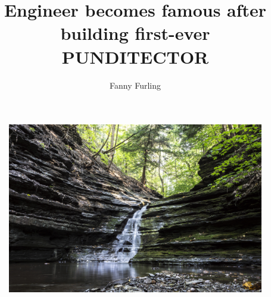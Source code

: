 \documentclass{bonaparticle}
\title {Engineer becomes famous after building first-ever PUNDITECTOR}
\author{Fanny Furling}
\begin{document}
    \maketitle
    
    \begin{lead}
        \lipsum[1]
    \end{lead}
    
    \begin{multicols}{3}
        \lipsum[2-11]
    \end{multicols}
    
    \begin{figure}
        \includegraphics[width=\textwidth]{landscape}
    \end{figure}
\end{document}

